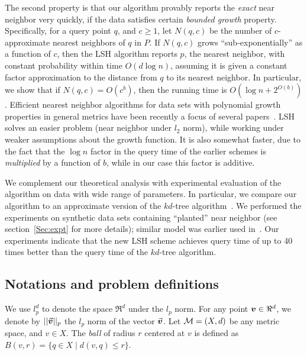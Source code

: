 \documentclass[12pt]{article}
\newcommand{\bm}[1]{\mbox{\boldmath$#1$}}
\newcommand{\MS}{{\cal M}}
\begin{document}
The second property is that our algorithm provably reports the {\em exact} near neighbor very quickly, if the data satisfies certain {\em bounded growth} property.
Specifically, for a query point $q$, and $c \ge 1$,  let $N(q,c)$ be the number of $c$-approximate nearest neighbors of $q$ in $P$. 
If $N(q,c)$ grows ``sub-exponentially'' as a function of $c$, then the
LSH algorithm reports $p$, the nearest neighbor, with constant probability within time $O(d \log n)$, assuming it is given a constant factor approximation to the distance from $q$ to its nearest neighbor.
In particular, we show that if $N(q,c)=O(c^b)$, then the running time is $O(\log n +2^{O(b)})$. 
Efficient nearest neighbor algorithms for data sets with polynomial growth properties in general metrics have been recently a focus of several papers~\cite{Cl3,KRu,KLee}.
LSH solves an easier problem (near neighbor under $l_2$ norm), while working under weaker assumptions about the growth function.
It is also somewhat faster, due to the fact that the 
$\log n$ factor in the query time of the earlier schemes is {\em multiplied} by a function of $b$, while in our case this factor is additive. 

We complement our theoretical analysis with experimental evaluation of the algorithm on data with wide range of parameters.
In particular, we compare our algorithm to an approximate version of 
the $kd$-tree algorithm~\cite{AMexp}.
We performed the experiments on synthetic data sets containing ``planted'' near neighbor (see section~\ref{Sec:expt} for more details); similar model was earlier used in~\cite{Yia2}.
Our experiments indicate that the new LSH scheme achieves query time of up to 40 times better than the query time of the $kd$-tree algorithm.


\subsection{Notations and problem definitions}
We use $l^d_p$ to denote the space $\Re^d$ under the $l_p$ norm. For any point
$\bm{v} \in \Re^d$, we denote by $||\vec{\bm{v}}||_p$ the $l_p$ norm of the vector
$\vec{\bm{v}}$. Let $\MS=(X,d)$ be any metric space, and $v \in X$. The {\em ball} of radius $r$ centered at $v$ is defined as
$B(v,r) = \{ q\in X \mid d(v,q) \leq r\}$.
\end{document}
